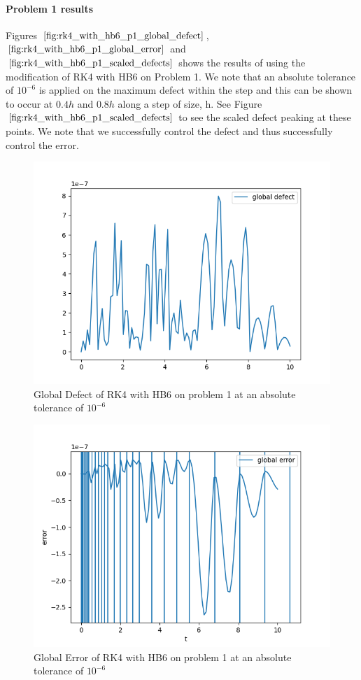 \documentclass{article}
\begin{document}
\paragraph{Problem 1 results}
Figures $\ref{fig:rk4_with_hb6_p1_global_defect}$, $\ref{fig:rk4_with_hb6_p1_global_error}$ and $\ref{fig:rk4_with_hb6_p1_scaled_defects}$ shows the results of using the modification of RK4 with HB6 on Problem 1. We note that an absolute tolerance of $10^{-6}$ is applied on the maximum defect within the step and this can be shown to occur at $0.4h$ and $0.8h$ along a step of size, h. See Figure $\ref{fig:rk4_with_hb6_p1_scaled_defects}$ to see the scaled defect peaking at these points. We note that we successfully control the defect and thus successfully control the error.

\begin{figure}[H]
\centering
\includegraphics[width=0.7\linewidth]{./figures/rk4_with_hb6_p1_global_defect}
\caption{Global Defect of RK4 with HB6 on problem 1 at an absolute tolerance of $10^{-6}$}
\label{fig:rk4_with_hb6_p1_global_defect}
\end{figure}

\begin{figure}[H]
\centering
\includegraphics[width=0.7\linewidth]{./figures/rk4_with_hb6_p1_global_error}
\caption{Global Error of RK4 with HB6 on problem 1 at an absolute tolerance of $10^{-6}$}
\label{fig:rk4_with_hb6_p1_global_error}
\end{figure}
\end{document}
